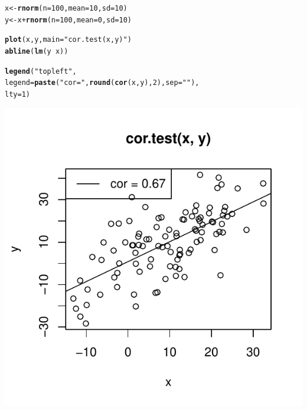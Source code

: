 \documentclass{tufte-book}\usepackage[]{graphicx}\usepackage[]{color}
\makeatletter
\def\maxwidth{ %
  \ifdim\Gin@nat@width>\linewidth
    \linewidth
  \else
    \Gin@nat@width
  \fi
}
\newcommand{\hlnum}[1]{\textcolor[rgb]{0.686,0.059,0.569}{#1}}%
\newcommand{\hlstr}[1]{\textcolor[rgb]{0.192,0.494,0.8}{#1}}%
\newcommand{\hlopt}[1]{\textcolor[rgb]{0,0,0}{#1}}%
\newcommand{\hlstd}[1]{\textcolor[rgb]{0.345,0.345,0.345}{#1}}%
\newcommand{\hlkwb}[1]{\textcolor[rgb]{0.69,0.353,0.396}{#1}}%
\newcommand{\hlkwc}[1]{\textcolor[rgb]{0.333,0.667,0.333}{#1}}%
\newcommand{\hlkwd}[1]{\textcolor[rgb]{0.737,0.353,0.396}{\textbf{#1}}}%
\newenvironment{kframe}{%
 \def\at@end@of@kframe{}%
 \ifinner\ifhmode%
  \def\at@end@of@kframe{\end{minipage}}%
  \begin{minipage}{\columnwidth}%
 \fi\fi%
 \def\FrameCommand##1{\hskip\@totalleftmargin \hskip-\fboxsep
 \colorbox{shadecolor}{##1}\hskip-\fboxsep
     \hskip-\linewidth \hskip-\@totalleftmargin \hskip\columnwidth}%
 \MakeFramed {\advance\hsize-\width
   \@totalleftmargin\z@ \linewidth\hsize
   \@setminipage}}%
 {\par\unskip\endMakeFramed%
 \at@end@of@kframe}
\newenvironment{knitrout}{}{} %
\makeatother
\begin{document}
\begin{marginfigure}
\begin{tiny}
\begin{knitrout}
\color{fgcolor}\begin{kframe}
\begin{alltt}
\hlstd{x} \hlkwb{<-} \hlkwd{rnorm}\hlstd{(}\hlkwc{n} \hlstd{=} \hlnum{100}\hlstd{,} \hlkwc{mean} \hlstd{=} \hlnum{10}\hlstd{,} \hlkwc{sd} \hlstd{=} \hlnum{10}\hlstd{)}
\hlstd{y} \hlkwb{<-} \hlstd{x} \hlopt{+} \hlkwd{rnorm}\hlstd{(}\hlkwc{n} \hlstd{=} \hlnum{100}\hlstd{,} \hlkwc{mean} \hlstd{=} \hlnum{0}\hlstd{,} \hlkwc{sd} \hlstd{=} \hlnum{10}\hlstd{)}

\hlkwd{plot}\hlstd{(x, y,} \hlkwc{main} \hlstd{=} \hlstr{"cor.test(x, y)"}\hlstd{)}
\hlkwd{abline}\hlstd{(}\hlkwd{lm}\hlstd{(y} \hlopt{~} \hlstd{x))}

\hlkwd{legend}\hlstd{(}\hlstr{"topleft"}\hlstd{,}
       \hlkwc{legend} \hlstd{=} \hlkwd{paste}\hlstd{(}\hlstr{"cor = "}\hlstd{,} \hlkwd{round}\hlstd{(}\hlkwd{cor}\hlstd{(x, y),} \hlnum{2}\hlstd{),} \hlkwc{sep} \hlstd{=} \hlstr{""}\hlstd{),}
       \hlkwc{lty} \hlstd{=} \hlnum{1}\hlstd{)}
\end{alltt}
\end{kframe}
\includegraphics[width=\maxwidth]{figure/unnamed-chunk-259-1} 

\end{knitrout}
\end{tiny}
\end{marginfigure}
\end{document}
